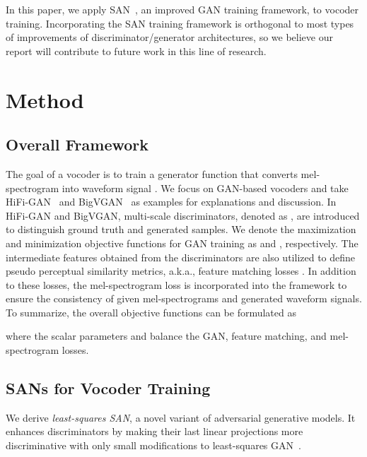 \documentclass{article}
\begin{document}
In this paper, we apply SAN~\cite{takida2023san}, an improved GAN training framework, to vocoder training. Incorporating the SAN training framework is orthogonal to most types of improvements of discriminator/generator architectures, so we believe our report will contribute to future work in this line of research.

\section{Method}
\label{sec:proposed_method}

\subsection{Overall Framework}
\label{ssec:overall_framework}
The goal of a vocoder is to train a generator function  that converts mel-spectrogram  into waveform signal . We focus on GAN-based vocoders and take HiFi-GAN~\cite{kong2020hifigan} and BigVGAN~\cite{lee2023bigvgan} as examples for explanations and discussion. In HiFi-GAN and BigVGAN, multi-scale discriminators, denoted as , are introduced to distinguish ground truth and generated samples. We denote the maximization and minimization objective functions for GAN training as  and , respectively. The intermediate features obtained from the discriminators are also utilized to define pseudo perceptual similarity metrics, a.k.a., feature matching losses . In addition to these losses, the mel-spectrogram loss  is incorporated into the framework to ensure the consistency of given mel-spectrograms and generated waveform signals. To summarize, the overall objective functions can be formulated as

where the scalar parameters  and  balance the GAN, feature matching, and mel-spectrogram losses. 


\subsection{SANs for Vocoder Training}
\label{ssec:san_vocoder}

We derive \textit{least-squares SAN}, a novel variant of adversarial generative models. It enhances discriminators by making their last linear projections more discriminative with only small modifications to least-squares GAN~\cite{mao2017least}.
\end{document}
